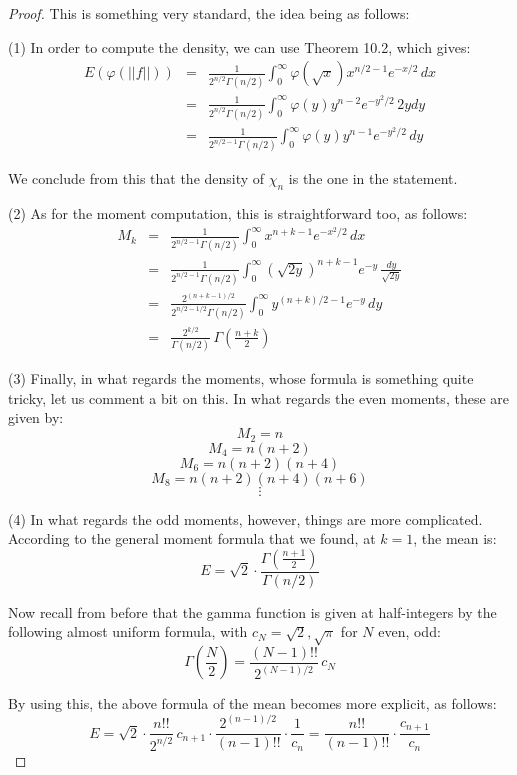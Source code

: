 \documentclass[12pt]{amsbook}
\begin{document}
\begin{proof}
This is something very standard, the idea being as follows:

\medskip

(1) In order to compute the density, we can use Theorem 10.2, which gives:
\begin{eqnarray*}
E(\varphi(||f||))
&=&\frac{1}{2^{n/2}\Gamma(n/2)}\int_0^\infty\varphi(\sqrt{x})x^{n/2-1}e^{-x/2}\,dx\\
&=&\frac{1}{2^{n/2}\Gamma(n/2)}\int_0^\infty\varphi(y)y^{n-2}e^{-y^2/2}\,2ydy\\
&=&\frac{1}{2^{n/2-1}\Gamma(n/2)}\int_0^\infty\varphi(y)y^{n-1}e^{-y^2/2}\,dy
\end{eqnarray*}

We conclude from this that the density of $\chi_n$ is the one in the statement.

\medskip

(2) As for the moment computation, this is straightforward too, as follows:
\begin{eqnarray*}
M_k
&=&\frac{1}{2^{n/2-1}\Gamma(n/2)}\int_0^\infty x^{n+k-1}e^{-x^2/2}\,dx\\
&=&\frac{1}{2^{n/2-1}\Gamma(n/2)}\int_0^\infty\left(\sqrt{2y}\right)^{n+k-1}e^{-y}\,\frac{dy}{\sqrt{2y}}\\
&=&\frac{2^{(n+k-1)/2}}{2^{n/2-1/2}\Gamma(n/2)}\int_0^\infty y^{(n+k)/2-1}e^{-y}\,dy\\
&=&\frac{2^{k/2}}{\Gamma(n/2)}\,\Gamma\left(\frac{n+k}{2}\right)
\end{eqnarray*}

(3) Finally, in what regards the moments, whose formula is something quite tricky, let us comment a bit on this. In what regards the even moments, these are given by:
$$M_2=n$$
$$M_4=n(n+2)$$
$$M_6=n(n+2)(n+4)$$
$$M_8=n(n+2)(n+4)(n+6)$$
$$\vdots$$

(4) In what regards the odd moments, however, things are more complicated. According to the general moment formula that we found, at $k=1$, the mean is:
$$E=\sqrt{2}\cdot\frac{\Gamma\left(\frac{n+1}{2}\right)}{\Gamma(n/2)}$$

Now recall from before that the gamma function is given at half-integers by the following almost uniform formula, with $c_N=\sqrt{2},\sqrt{\pi}$ for $N$ even, odd:
$$\Gamma\left(\frac{N}{2}\right)=\frac{(N-1)!!}{2^{(N-1)/2}}\,c_N$$

By using this, the above formula of the mean becomes more explicit, as follows:
$$E
=\sqrt{2}\cdot\frac{n!!}{2^{n/2}}\,c_{n+1}\cdot\frac{2^{(n-1)/2}}{(n-1)!!}\cdot\frac{1}{c_n}
=\frac{n!!}{(n-1)!!}\cdot\frac{c_{n+1}}{c_n}$$


\end{proof}
\end{document}
